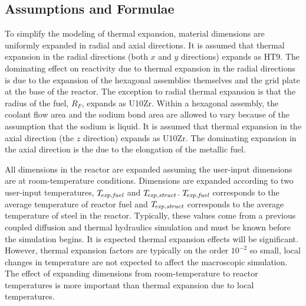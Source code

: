   \subsection{Assumptions and Formulae}
  \label{sec:model_details__assumptions_and_formulae}
    To simplify the modeling of thermal expansion, material dimensions are
    uniformly expanded in radial and axial directions. It is assumed that 
    thermal expansion in the radial directions (both $x$ and $y$ directions) 
    expands as HT9. The dominating effect on reactivity due to thermal 
    expansion in the radial directions is due to the expansion of the hexagonal 
    assemblies themselves and the grid plate at the base of the reactor. The 
    exception to radial thermal expansion is that the radius of the fuel, 
    $R_F$, expands as U10Zr. Within a hexagonal assembly, the coolant flow area 
    and the sodium bond area are allowed to vary because of the assumption that 
    the sodium is liquid. It is assumed that thermal expansion in the axial 
    direction (the $z$ direction) expands as U10Zr. The dominating expansion 
    in the axial direction is the due to  the elongation of the metallic fuel.
    
    All dimensions in the reactor are expanded assuming the user-input
    dimensions are at room-temperature conditions. Dimensions are expanded
    according to two user-input temperatures, ${T_{\!\mbox{\scriptsize \em exp,fuel}}}$ and $T_{\!\mbox{\scriptsize \em exp,struct}}$.
    ${T_{\!\mbox{\scriptsize \em exp,fuel}}}$ corresponds to the average temperature of reactor fuel and
    $T_{\!\mbox{\scriptsize \em exp,struct}}$ corresponds to the average temperature of steel in the
    reactor. Typically, these values come from a previous coupled diffusion and
    thermal hydraulics simulation and must be known before the simulation
    begins. It is expected thermal expansion effects will be significant.
    However, thermal expansion factors are typically on the order $10^{-2}$ so
    small, local changes in temperature are not expected to affect the
    macroscopic simulation. The effect of expanding dimensions from
    room-temperature to reactor temperatures is more important than thermal
    expansion due to local temperatures.

